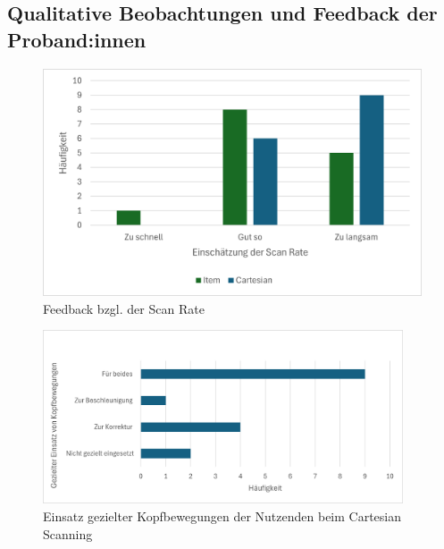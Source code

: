 \subsection{Qualitative Beobachtungen und Feedback der Proband:innen}

\begin{figure}[tbh]
    \centering
   \includegraphics{images/Results/ScanRate.png}
    \caption{Feedback bzgl. der Scan Rate}
    \label{fig:scanrate}
   \end{figure}

   \begin{figure}[tbh]
    \centering
   \includegraphics[width=0.95\textwidth]{images/Results/EinsatzKopfbewegungen-Cartesian.png}
    \caption{Einsatz gezielter Kopfbewegungen der Nutzenden beim Cartesian Scanning}
    \label{fig:kopfbewegungenCartesian}
   \end{figure}